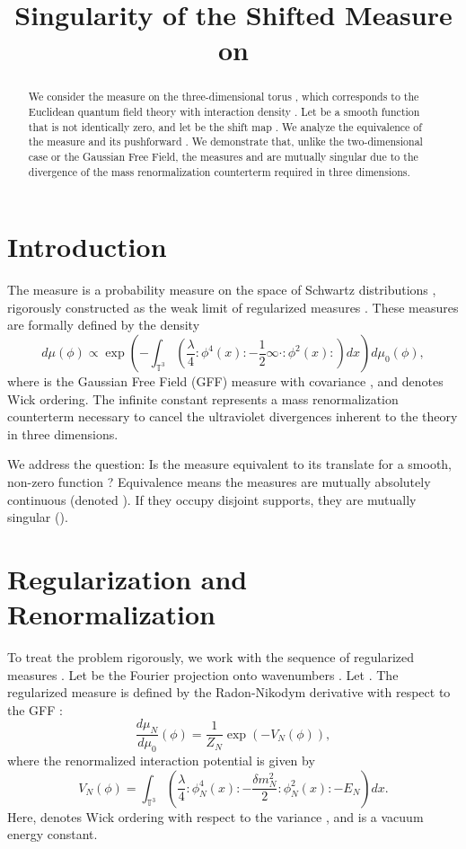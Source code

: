 \documentclass[12pt]{article}
\title{Singularity of the Shifted  Measure on }
\author{}
\date{}
\begin{document}
\maketitle

\begin{abstract}
We consider the  measure  on the three-dimensional torus , which corresponds to the Euclidean quantum field theory with interaction density . Let  be a smooth function that is not identically zero, and let  be the shift map . We analyze the equivalence of the measure  and its pushforward . We demonstrate that, unlike the two-dimensional case or the Gaussian Free Field, the measures  and  are mutually singular due to the divergence of the mass renormalization counterterm required in three dimensions.
\end{abstract}

\section{Introduction}

The  measure  is a probability measure on the space of Schwartz distributions , rigorously constructed as the weak limit of regularized measures . These measures are formally defined by the density
\begin{equation}
d\mu(\phi) \propto \exp\left( - \int_{\mathbb{T}^3} \left( \frac{\lambda}{4} :\phi^4(x): - \frac{1}{2} \infty \cdot :\phi^2(x): \right) dx \right) d\mu_0(\phi),
\end{equation}
where  is the Gaussian Free Field (GFF) measure with covariance , and  denotes Wick ordering. The infinite constant represents a mass renormalization counterterm necessary to cancel the ultraviolet divergences inherent to the theory in three dimensions.

We address the question: Is the measure  equivalent to its translate  for a smooth, non-zero function ? Equivalence means the measures are mutually absolutely continuous (denoted ). If they occupy disjoint supports, they are mutually singular ().

\section{Regularization and Renormalization}

To treat the problem rigorously, we work with the sequence of regularized measures . Let  be the Fourier projection onto wavenumbers . Let . The regularized measure  is defined by the Radon-Nikodym derivative with respect to the GFF :
\begin{equation}
\frac{d\mu_N}{d\mu_0}(\phi) = \frac{1}{Z_N} \exp\left( - V_N(\phi) \right),
\end{equation}
where the renormalized interaction potential  is given by
\begin{equation}
V_N(\phi) = \int_{\mathbb{T}^3} \left( \frac{\lambda}{4} :\phi_N^4(x): - \frac{\delta m_N^2}{2} :\phi_N^2(x): - E_N \right) dx.
\end{equation}
Here,  denotes Wick ordering with respect to the variance , and  is a vacuum energy constant.
\end{document}
